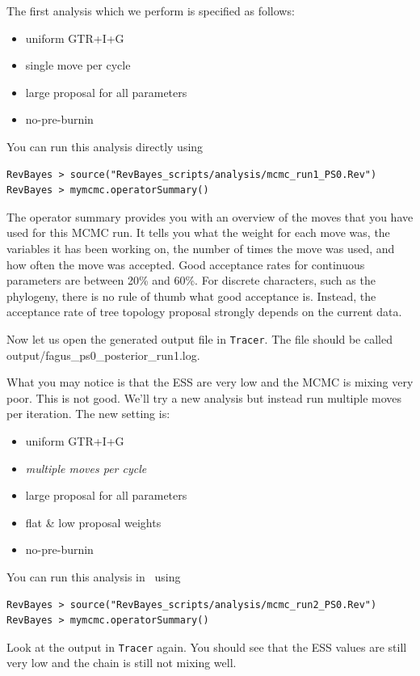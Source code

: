 \documentclass[11pt]{article}
\begin{document}
The first analysis which we perform is specified as follows:
\begin{itemize}
\item{uniform GTR+I+G}
\item{single move per cycle}
\item{large proposal for all parameters}
\item{no-pre-burnin}
\end{itemize}
You can run this analysis directly using
{\tt \begin{snugshade*}
\begin{lstlisting}
RevBayes > source("RevBayes_scripts/analysis/mcmc_run1_PS0.Rev")
RevBayes > mymcmc.operatorSummary()
\end{lstlisting}
\end{snugshade*}}
The operator summary provides you with an overview of the moves that you have used for this MCMC run.
It tells you what the weight for each move was, the variables it has been working on, the number of times the move was used, and how often the move was accepted.
Good acceptance rates for continuous parameters are between 20\% and 60\%.
For discrete characters, such as the phylogeny, there is no rule of thumb what good acceptance is.
Instead, the acceptance rate of tree topology proposal strongly depends on the current data.

Now let us open the generated output file in \verb!Tracer!.
The file should be called output/fagus\_ps0\_posterior\_run1.log.

What you may notice is that the ESS are very low and the MCMC is mixing very poor.
This is not good. 
We'll try a new analysis but instead run multiple moves per iteration.
The new setting is:
\begin{itemize}
\item{uniform GTR+I+G}
\item{\it multiple moves per cycle}
\item{large proposal for all parameters}
\item{flat \& low proposal weights}
\item{no-pre-burnin}
\end{itemize}
You can run this analysis in \RevBayes~using
{\tt \begin{snugshade*}
\begin{lstlisting}
RevBayes > source("RevBayes_scripts/analysis/mcmc_run2_PS0.Rev")
RevBayes > mymcmc.operatorSummary()
\end{lstlisting}
\end{snugshade*}}
Look at the output in \verb!Tracer! again.
You should see that the ESS values are still very low and the chain is still not mixing well.
\end{document}
